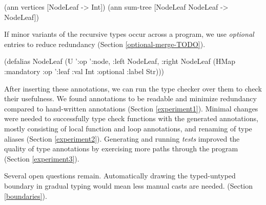 \begin{cljlisting}
(ann vertices [NodeLeaf -> Int])
(ann sum-tree [NodeLeaf NodeLeaf -> NodeLeaf])
\end{cljlisting}
 
If minor variants of the recursive types occur
across a program,
we use \textit{optional} entries%
to reduce redundancy (Section \ref{optional-merge-TODO}).
 
\begin{cljlisting}
(defalias NodeLeaf 
  (U '{:op ':node, :left NodeLeaf, :right NodeLeaf}
     (HMap :mandatory {:op ':leaf :val Int}
           :optional {:label Str})))
\end{cljlisting}

After inserting these annotations, we can run the
type checker over them to check their usefulness.
We found annotations to be readable and minimize
redundancy compared to hand-written annotations
(Section \ref{experiment1}).
Minimal changes were needed to successfully type check
functions with the generated annotations,
mostly consisting of local function and loop annotations,
and renaming of type aliases
(Section \ref{experiment2}).
Generating and running \textit{tests} improved the quality
of type annotations by exercising more paths through the
program (Section \ref{experiment3}).

Several open questions remain.
Automatically
drawing the typed-untyped boundary in gradual typing
would mean less manual casts are needed.
(Section \ref{boundaries}).

%
%
%

